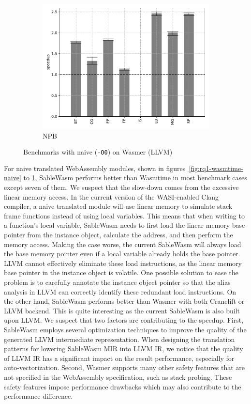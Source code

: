 \begin{figure}
\begin{subfigure}[t]{.45\textwidth}
        \includegraphics[width=\textwidth]
        {Images/6.1.RQ1/npb-wasmer-llvm-naive.pdf}
        \caption{NPB}
    \end{subfigure}
    \caption{Benchmarks with naive (\texttt{-O0}) on Wasmer (LLVM)}
    \label{fig:rq1-wasmer-llvm-naive}
\end{figure}

For naive translated WebAssembly modules, shown in
figures~\ref{fig:rq1-wasmtime-naive} to \ref{fig:rq1-wasmer-llvm-naive},
SableWasm performs better than Wasmtime in most benchmark cases except seven
of them. We suspect that the slow-down comes from the excessive linear
memory access. In the current version of the WASI-enabled Clang compiler, a
naive translated module will use linear memory to simulate stack frame functions
instead of using local variables. This means that when writing to a function's
local variable, SableWasm needs to first load the linear memory base pointer
from the instance object, calculate the address, and then perform the memory
access. Making the case worse, the current SableWasm will always load the base
memory pointer even if a local variable already holds the base pointer. LLVM
cannot effectively eliminate these load instructions, as the linear memory base
pointer in the instance object is volatile. One possible solution to ease the
problem is to carefully annotate the instance object pointer so that the alias
analysis in LLVM can correctly identify these redundant load instructions.
On the other hand, SableWasm performs better than Wasmer with both Cranelift
or LLVM backend. This is quite interesting as the current SableWasm
is also built upon LLVM. We suspect that two factors are contributing to the
speedup. First, SableWasm employs several optimization techniques to improve
the quality of the generated LLVM intermediate representation. When designing
the translation patterns for lowering SableWasm MIR into LLVM IR, we notice
that the quality of LLVM IR has a significant impact on the result performance,
especially for auto-vectorization. Second, Wasmer supports many other safety
features that are not specified in the WebAssembly specification, such as
stack probing. These safety features impose performance drawbacks which may
also contribute to the performance difference.

